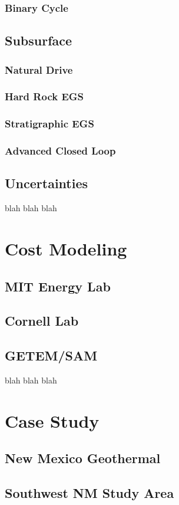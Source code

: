 \subsubsection{Binary Cycle}
\subsection{Subsurface}
\subsubsection{Natural Drive}
\subsubsection{Hard Rock EGS}
\subsubsection{Stratigraphic EGS}
\subsubsection{Advanced Closed Loop}
\subsection{Uncertainties}
blah blah blah

\section{Cost Modeling}\label{ch2:costmod}
\subsection{MIT Energy Lab}
\subsection{Cornell Lab}
\subsection{GETEM/SAM}
blah blah blah

\section{Case Study}\label{ch2:case}
\subsection{New Mexico Geothermal}
\subsection{Southwest NM Study Area}
